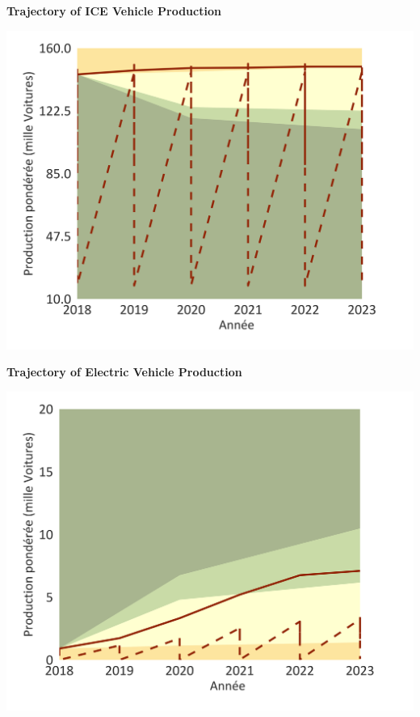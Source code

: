 \documentclass[10pt,table]{article}\usepackage[]{graphicx}\usepackage[]{color}
\begin{document}
	\begin{minipage}[t]{.49\linewidth}
		\textbf{Trajectory of ICE Vehicle Production}

		\includegraphics[trim = {0 0cm 0 0},width=1\linewidth]{ReportOutputs/Fig24}

	\end{minipage}	
	\hspace{.02\linewidth}
	\begin{minipage}[t]{.49\textwidth}
		\textbf{Trajectory of Electric Vehicle Production}

		\includegraphics[trim = {0 0cm 0 0},width=1\linewidth]{ReportOutputs/Fig25}

	\end{minipage}	
\end{document}
